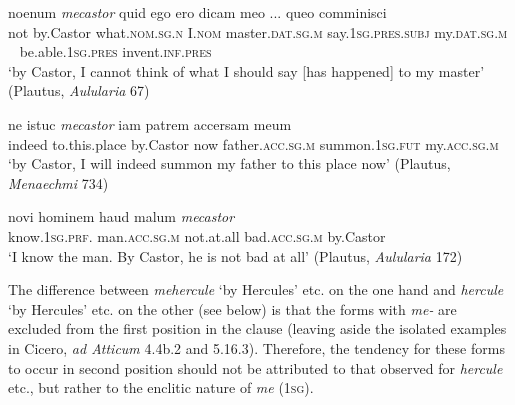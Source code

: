 \begin{exe}
\ex
\gll noenum \emph{mecastor} quid ego ero dicam meo ... queo comminisci\\
not by.Castor what.\textsc{nom.sg.n} I.\textsc{nom} master.\textsc{dat.sg.m} say.\textsc{1sg.pres.subj} my.\textsc{dat.sg.m} ~ be.able.\textsc{1sg.pres} invent.\textsc{inf.pres}\\
\trans `by Castor, I cannot think of what I should say [has happened] to my master' (Plautus, \textit{Aulularia} 67)
\label{interjection4}
\end{exe}%

\begin{exe}
\ex
\gll ne istuc \emph{mecastor} iam patrem accersam meum\\
indeed to.this.place by.Castor now father.\textsc{acc.sg.m} summon.\textsc{1sg.fut} my.\textsc{acc.sg.m}\\
\trans `by Castor, I will indeed summon my father to this place now' (Plautus, \textit{Menaechmi} 734)
\label{interjection5}
\end{exe}%

\begin{exe}
\ex
\gll novi hominem haud malum \emph{mecastor}\\
know.\textsc{1sg.prf.} man.\textsc{acc.sg.m} not.at.all bad.\textsc{acc.sg.m} by.Castor\\
\trans `I know the man. By Castor, he is not bad at all' (Plautus, \textit{Aulularia} 172)
\label{interjection6}
\end{exe} 

The difference between  \emph{mehercule} `by Hercules' etc. on the one hand and \emph{hercule} `by Hercules' etc. on the other (see below) is that the forms with \emph{me-} are excluded from the first position in the clause (leaving aside the isolated examples in Cicero, \textit{ad Atticum} 4.4b.2 and 5.16.3). Therefore, the tendency for these forms to occur in second position should not be attributed to that observed for \emph{hercule} etc., but rather to the enclitic nature of \emph{me} (\textsc{1sg}).


